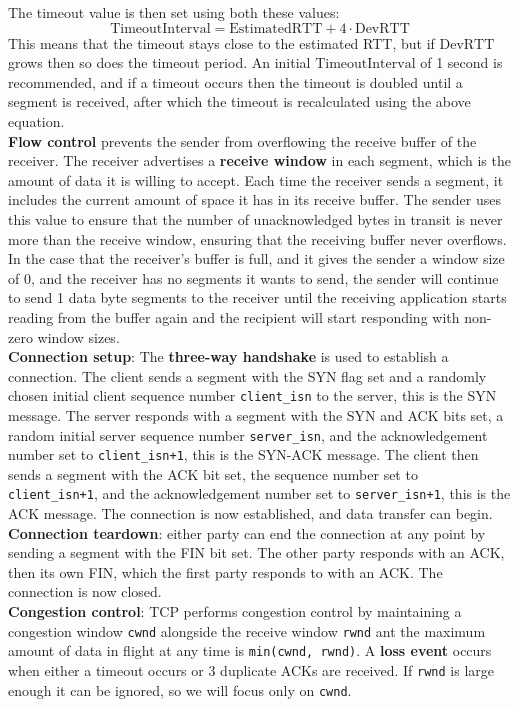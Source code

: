 The timeout value is then set using both these values:
$$
	\text{TimeoutInterval}=\text{EstimatedRTT}+4\cdot\text{DevRTT}
$$
This means that the timeout stays close to the estimated RTT, but if $\text{DevRTT}$ grows then so does the timeout period.
An initial $\text{TimeoutInterval}$ of 1 second is recommended, and if a timeout occurs then the timeout is doubled until a segment is received, after which the timeout is recalculated using the above equation.\\
\textbf{Flow control} prevents the sender from overflowing the receive buffer of the receiver. The receiver advertises a \textbf{receive window} in each segment, which is the amount of data it is willing to accept. Each time the receiver sends a segment, it includes the current amount of space it has in its receive buffer. The sender uses this value to ensure that the number of unacknowledged bytes in transit is never more than the receive window, ensuring that the receiving buffer never overflows. In the case that the receiver's buffer is full, and it gives the sender a window size of 0, and the receiver has no segments it wants to send, the sender will continue to send 1 data byte segments to the receiver until the receiving application starts reading from the buffer again and the recipient will start responding with non-zero window sizes.\\
\textbf{Connection setup}: The \textbf{three-way handshake} is used to establish a connection. The client sends a segment with the SYN flag set and a randomly chosen initial client sequence number \verb|client_isn| to the server, this is the SYN message. The server responds with a segment with the SYN and ACK bits set, a random initial server sequence number \verb|server_isn|, and the acknowledgement number set to \verb|client_isn+1|, this is the SYN-ACK message. The client then sends a segment with the ACK bit set, the sequence number set to \verb|client_isn+1|, and the acknowledgement number set to \verb|server_isn+1|, this is the ACK message. The connection is now established, and data transfer can begin.\\
\textbf{Connection teardown}: either party can end the connection at any point by sending a segment with the FIN bit set. The other party responds with an ACK, then its own FIN, which the first party responds to with an ACK. The connection is now closed.\\
\textbf{Congestion control}: TCP performs congestion control by maintaining a congestion window \verb|cwnd| alongside the receive window \verb|rwnd| ant the maximum amount of data in flight at any time is \verb|min(cwnd, rwnd)|. A \textbf{loss event} occurs when either a timeout occurs or 3 duplicate ACKs are received. If \verb|rwnd| is large enough it can be ignored, so we will focus only on \verb|cwnd|.\\
